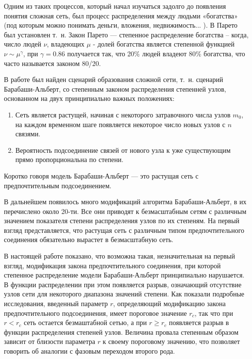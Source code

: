 \documentclass[10pt,aps,pra]{revtex4-1}
\begin{document}
    Одним из таких процессов, который начал изучаться задолго до появления понятия сложная сеть, был процесс распределения между людьми «богатства» (под которым можно понимать деньги, вложения, недвижимость... ). В \cite{Pareto} Парето был установлен т. н. Закон Парето — степенное распределение богатства – когда, число людей $\nu$, владеющих $\mu$ - долей богатства является степенной функцией $\nu \sim \mu^\gamma$, при $\gamma=0.86$ получается так, что 20\% людей владеют 80\% богатства, что часто называется законом 80/20. 

    В работе \cite{AlBa1} был найден сценарий образования сложной сети, т. н. сценарий Барабаши-Альберт, со степенным законом распределения степенней узлов, основанном на двух принципиально важных положениях:
        \begin{enumerate} 
            \item Сеть является растущей, начиная с некоторого затравочного числа узлов $m_0$, на каждом временном шаге появляется некоторое число новых узлов с $n$ связями.
            \item Вероятность подсоединение связей от нового узла к уже существующим прямо пропорциональна по степени.
        \end{enumerate}
    Коротко говоря модель Барабаши-Альберт — это растущая сеть с предпочтительным подсоединением.

    В дальнейшем появилось много модификаций алгоритма Барабаши-Альберт, в \cite{AlBa2} их перечислено около 20-ти. Все они приводят к безмасштабным сетям с различным значением показателя степени распределения узлов по их степеням. На первый взгляд представляется, что растущая сеть с различным типом предпочтительного соединения обязательно вырастет в безмасштабную сеть.

    В настоящей работе показано, что возможна такая, незначительная на первый взгляд, модификация закона предпочтительного соединения, при которой степенное распределение модели Барабаши-Альберт принципиально нарушается. В функции распределении при этом появляется разрыв, означающий отсутствие узлов сети для некоторого диапазона значений степени. Как показали подробные исследования, введенный параметр $r$, определяющий модификацию закона предпочтительного подсоединения, имеет пороговое значение $r_c$, так что при $r<r_c$ сеть остается безмаштабной сетью, а при $r \geq r_c$ появляется разрыв в функции распределения степеней узлов. Величина провала степенным образом зависит от близости параметра $r$ к своему пороговому значению, что позволяет говорить об аналогии с фазовым переходом второго рода.
\end{document}
